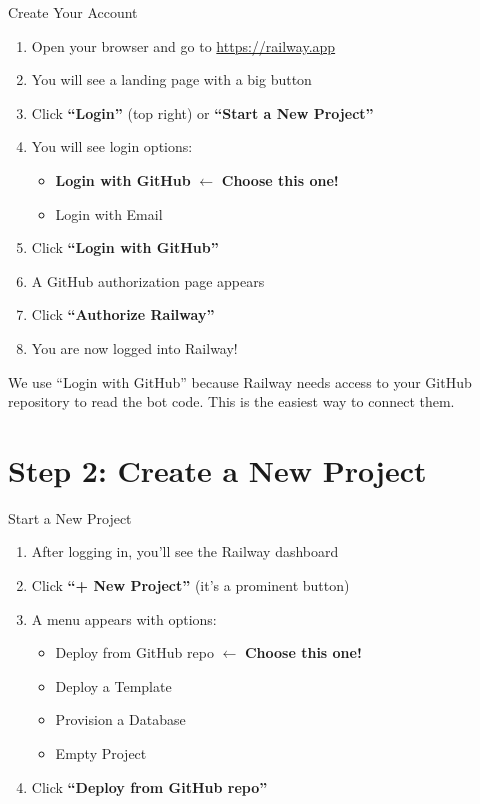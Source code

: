 \begin{stepbox}{Create Your Account}
\begin{enumerate}[leftmargin=1.5cm]
    \item Open your browser and go to \url{https://railway.app}
    \item You will see a landing page with a big button
    \item Click \textbf{``Login''} (top right) or \textbf{``Start a New Project''}
    \item You will see login options:
    \begin{itemize}
        \item \textbf{Login with GitHub} $\leftarrow$ \textbf{Choose this one!}
        \item Login with Email
    \end{itemize}
    \item Click \textbf{``Login with GitHub''}
    \item A GitHub authorization page appears
    \item Click \textbf{``Authorize Railway''}
    \item You are now logged into Railway!
\end{enumerate}
\end{stepbox}

\begin{tipbox}
We use ``Login with GitHub'' because Railway needs access to your GitHub repository to read the bot code. This is the easiest way to connect them.
\end{tipbox}

\section{Step 2: Create a New Project}

\begin{stepbox}{Start a New Project}
\begin{enumerate}[leftmargin=1.5cm]
    \item After logging in, you'll see the Railway dashboard
    \item Click \textbf{``+ New Project''} (it's a prominent button)
    \item A menu appears with options:
    \begin{itemize}
        \item Deploy from GitHub repo $\leftarrow$ \textbf{Choose this one!}
        \item Deploy a Template
        \item Provision a Database
        \item Empty Project
    \end{itemize}
    \item Click \textbf{``Deploy from GitHub repo''}
\end{enumerate}
\end{stepbox}

